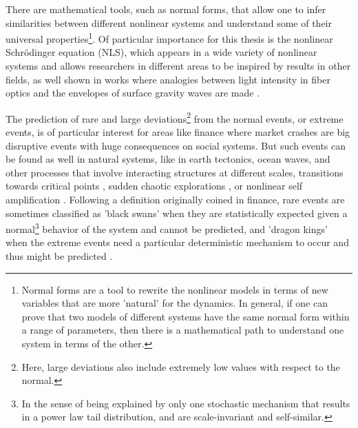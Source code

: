There are mathematical tools, such as normal forms, that allow one to infer similarities between different nonlinear systems and understand some of their universal properties\footnote{Normal forms \citep{Strogatz2000} are a tool to rewrite the nonlinear models in terms of new variables that are more 'natural' for the dynamics. In general, if one can prove that two models of different systems have the same normal form within a range of parameters, then  there is a mathematical path to understand one system in terms of the other.}. 
Of particular importance for this thesis is the nonlinear Schrödinger equation (NLS), which appears  in a wide variety of nonlinear systems and allows researchers in different areas to be inspired by results in other fields, as well shown in works where analogies between light intensity in fiber optics and the envelopes of surface gravity waves are made \citep{Solli2007}.

The prediction of rare and large deviations\footnote{Here, large deviations  also include extremely low values with respect to the normal.} from the normal events, or extreme events, is of particular interest for areas like finance where market crashes are big disruptive events with huge consequences on social systems. 
But such events can be found  as well in natural systems, like in earth tectonics, ocean waves, and other processes that involve interacting structures at different scales, transitions towards critical points \citep{Sornette2002}, sudden chaotic explorations \citep{Gomel2019}, or nonlinear self amplification \citep{Onorato2021}.
Following a definition originally coined in finance, rare events are sometimes classified as 'black swans' when they are statistically expected given a normal\footnote{In the sense of being explained by only one stochastic mechanism that results in a power law tail distribution, and are scale-invariant and self-similar.} behavior of the system and cannot be predicted, and 'dragon kings' when the extreme events need a particular deterministic mechanism to occur and thus might be predicted \citep{Sornette2009a}.

